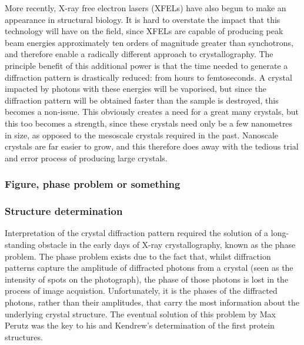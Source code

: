 \documentclass[a4paper,11pt,twoside,openright]{scrbook}
\begin{document}
More recently, X-ray free electron lasers (XFELs) have also begun to make an appearance in structural biology. It is hard to overstate the impact that this technology will have on the field, since XFELs are capable of producing peak beam energies approximately ten orders of magnitude greater than synchotrons, and therefore enable a radically different approach to crystallography. The principle benefit of this additional power is that the time needed to generate a diffraction pattern is drastically reduced: from hours to femtoseconds. A crystal impacted by photons with these energies will be vaporised, but since the diffraction pattern will be obtained faster than the sample is destroyed, this becomes a non-issue. This obviously creates a need for a great many crystals, but this too becomes a strength, since these crystals need only be a few nanometres in size, as opposed to the mesoscale crystals required in the past. Nanoscale crystals are far easier to grow, and this therefore does away with the tedious trial and error process of producing large crystals.

\subsubsection{Figure, phase problem or something}

\subsubsection{Structure determination}

Interpretation of the crystal diffraction pattern required the solution of a long-standing obstacle in the early days of X-ray crystallography, known as the phase problem. The phase problem exists due to the fact that, whilst diffraction patterns capture the amplitude of diffracted photons from a crystal (seen as the intensity of spots on the photograph), the phase of those photons is lost in the process of image acquistion. Unfortunately, it is the phases of the diffracted photons, rather than their amplitudes, that carry the most information about the underlying crystal structure. The eventual solution of this problem by Max Perutz was the key to his and Kendrew's determination of the first protein structures.
\end{document}
